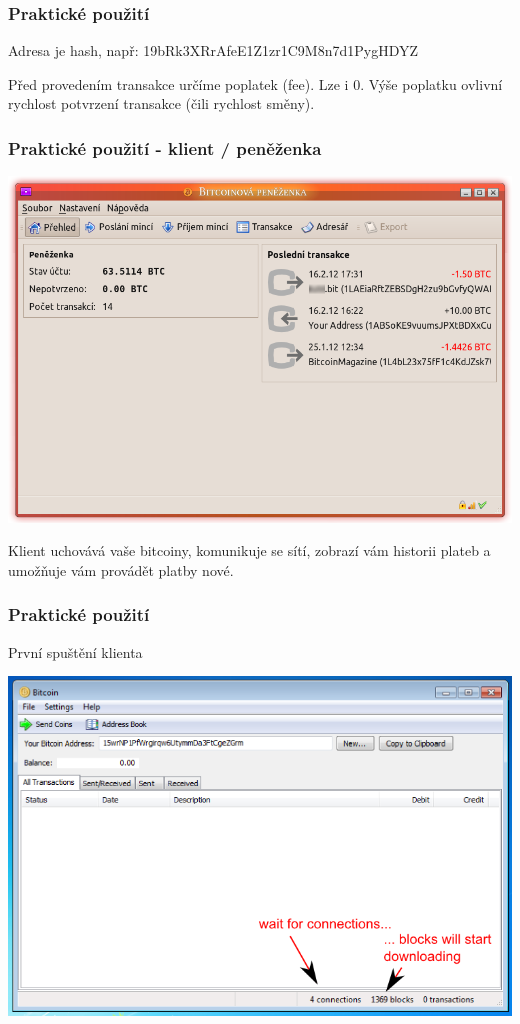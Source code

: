 \documentclass[xetex]{beamer}
\begin{document}
\begin{frame}
	\frametitle{Praktické použití}
	Adresa je hash, např: 19bRk3XRrAfeE1Z1zr1C9M8n7d1PygHDYZ

	\bigskip

	Před provedením transakce určíme poplatek (fee). Lze i 0. Výše poplatku ovlivní rychlost potvrzení transakce (čili rychlost směny). 
\end{frame}

\begin{frame}
 \frametitle{Praktické použití - klient / peněženka}
	\includegraphics[scale=0.3]{images/klient.png}

	\smallskip

	Klient uchovává vaše bitcoiny, komunikuje se sítí, zobrazí vám historii plateb a umožňuje vám provádět platby nové.
\end{frame}

\begin{frame}
 \frametitle{Praktické použití}
	
	První spuštění klienta

	\includegraphics[scale=0.4]{images/first-time-run.png}
\end{frame}
\end{document}

